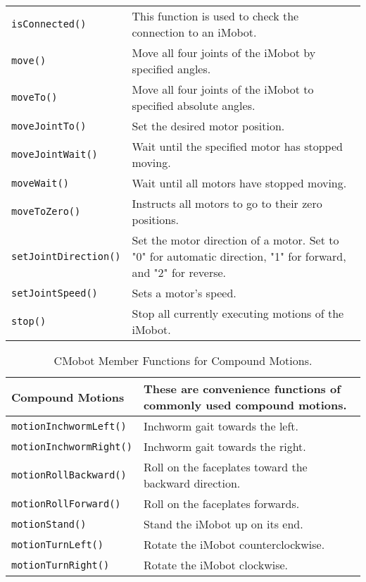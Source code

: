 \begin{table}[!hp]
\begin{center}
\begin{tabular}{p{38 mm}p{77 mm}}
\texttt{isConnected()} & This function is used to check the connection to an iMobot. \\
\texttt{move()} & Move all four joints of the iMobot by specified angles. \\
\texttt{moveTo()} & Move all four joints of the iMobot to specified absolute angles. \\
\texttt{moveJointTo()} & Set the desired motor position. \\
\texttt{moveJointWait()} & Wait until the specified motor has stopped moving. \\
\texttt{moveWait()} & Wait until all motors have stopped moving. \\
\texttt{moveToZero()} & Instructs all motors to go to their zero positions. \\
\texttt{setJointDirection()} & Set the motor direction of a motor. Set
to "0" for automatic direction, "1" for forward, and "2" for reverse. \\
\texttt{setJointSpeed()} & Sets a motor's speed. \\
\texttt{stop()} & Stop all currently executing motions of the iMobot. \\
\hline
\end{tabular}
\end{center}
\label{mobilec_api_cbinary}
\end{table}

\begin{table}[!h]
\begin{center}
\caption{CMobot Member Functions for Compound Motions.}
\begin{tabular}{p{38 mm}p{77 mm}}
Compound Motions & These are convenience functions of commonly used compound motions. \\
\hline
\texttt{motionInchwormLeft()} \dotfill & Inchworm gait towards the left. \\
\texttt{motionInchwormRight()} \dotfill & Inchworm gait towards the right. \\
\texttt{motionRollBackward()} \dotfill & Roll on the faceplates toward the backward direction. \\
\texttt{motionRollForward()} \dotfill & Roll on the faceplates forwards. \\
\texttt{motionStand()} \dotfill & Stand the iMobot up on its end. \\
\texttt{motionTurnLeft()} \dotfill & Rotate the iMobot counterclockwise. \\
\texttt{motionTurnRight()} \dotfill & Rotate the iMobot clockwise. \\
\hline
\end{tabular}
\end{center}
\label{mobilec_api_compound}
\end{table}

